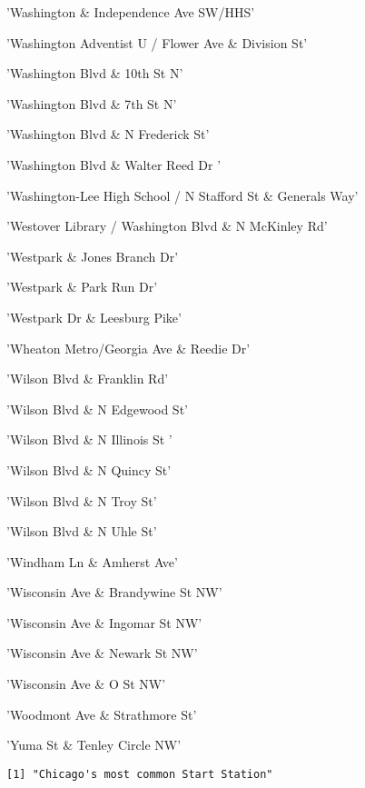 \documentclass[11pt]{article}
\begin{document}
\begin{enumerate*}
\item 'Washington \& Independence Ave SW/HHS'
\item 'Washington Adventist U / Flower Ave \& Division St'
\item 'Washington Blvd \& 10th St N'
\item 'Washington Blvd \& 7th St N'
\item 'Washington Blvd \& N Frederick St'
\item 'Washington Blvd \& Walter Reed Dr '
\item 'Washington-Lee High School / N Stafford St \& Generals Way'
\item 'Westover Library / Washington Blvd \& N McKinley Rd'
\item 'Westpark \& Jones Branch Dr'
\item 'Westpark \& Park Run Dr'
\item 'Westpark Dr \& Leesburg Pike'
\item 'Wheaton Metro/Georgia Ave \& Reedie Dr'
\item 'Wilson Blvd \& Franklin Rd'
\item 'Wilson Blvd \& N Edgewood St'
\item 'Wilson Blvd \& N Illinois St '
\item 'Wilson Blvd \& N Quincy St'
\item 'Wilson Blvd \& N Troy St'
\item 'Wilson Blvd \& N Uhle St'
\item 'Windham Ln \& Amherst Ave'
\item 'Wisconsin Ave \& Brandywine St NW'
\item 'Wisconsin Ave \& Ingomar St NW'
\item 'Wisconsin Ave \& Newark St NW'
\item 'Wisconsin Ave \& O St NW'
\item 'Woodmont Ave \& Strathmore St'
\item 'Yuma St \& Tenley Circle NW'
\end{enumerate*}


    
    \begin{Verbatim}[commandchars=\\\{\}]
[1] "Chicago's most common Start Station"

    \end{Verbatim}
\end{document}
